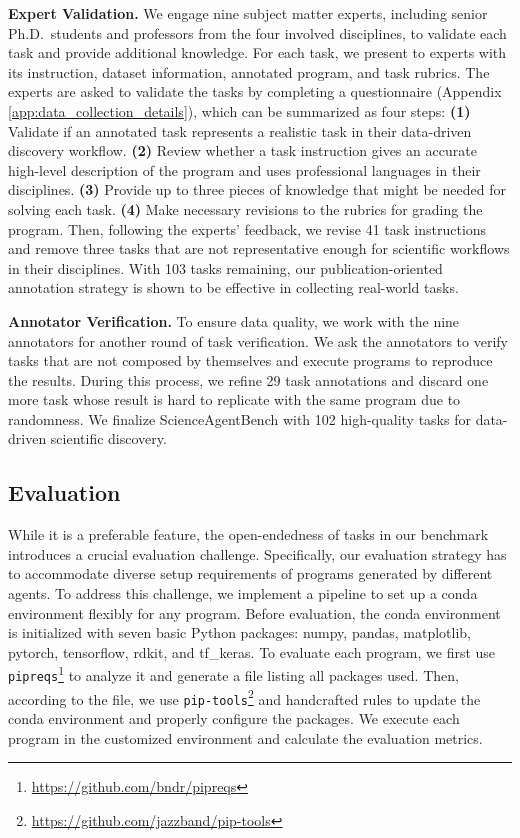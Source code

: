 \documentclass{article} %
\newcommand{\bench}{ScienceAgentBench\xspace}
\begin{document}
%
\textbf{Expert Validation.}
We engage nine subject matter experts, including senior Ph.D.\ students and professors from the four involved disciplines, to validate each task and provide additional knowledge.
For each task, we present to experts with its instruction, dataset information, annotated program, and task rubrics.
The experts are asked to validate the tasks by completing a questionnaire (Appendix \ref{app:data_collection_details}), which can be summarized as four steps:
\textbf{(1)} Validate if an annotated task represents a realistic task in their data-driven discovery workflow.
\textbf{(2)} Review whether a task instruction gives an accurate high-level description of the program and uses professional languages in their disciplines.
\textbf{(3)} Provide up to three pieces of knowledge that might be needed for solving each task.
\textbf{(4)} Make necessary revisions to the rubrics for grading the program.
Then, following the experts' feedback, we revise 41 task instructions and remove three tasks that are not representative enough for scientific workflows in their disciplines. 
With 103 tasks remaining, our publication-oriented annotation strategy is shown to be effective in collecting real-world tasks.
%

%
\textbf{Annotator Verification.}
To ensure data quality, we work with the nine annotators for another round of task verification. 
We ask the annotators to verify tasks that are not composed by themselves and execute programs to reproduce the results. 
During this process, we refine 29 task annotations and discard one more task whose result is hard to replicate with the same program due to randomness.
We finalize \bench with 102 high-quality tasks for data-driven scientific discovery.
%

\subsection{Evaluation}
\label{sec:eval}

%
While it is a preferable feature, the open-endedness of tasks in our benchmark introduces a crucial evaluation challenge.
Specifically, our evaluation strategy has to accommodate diverse setup requirements of programs generated by different agents.
To address this challenge, we implement a pipeline to set up a conda environment flexibly for any program.
Before evaluation, the conda environment is initialized with seven basic Python packages: numpy, pandas, matplotlib, pytorch, tensorflow, rdkit, and tf\_keras.
To evaluate each program, we first use \texttt{pipreqs}\footnote{\url{https://github.com/bndr/pipreqs}} to analyze it and generate a file listing all packages used.
Then, according to the file, we use \texttt{pip-tools}\footnote{\url{https://github.com/jazzband/pip-tools}} and handcrafted rules to update the conda environment and properly configure the packages.
We execute each program in the customized environment and calculate the evaluation metrics.
%
\end{document}
